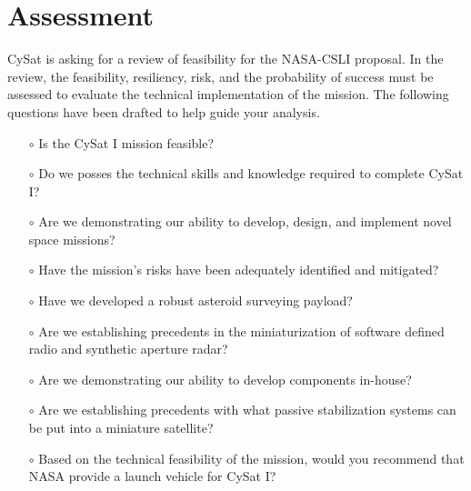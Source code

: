 \documentclass[nocover]            %
{CSLI}                       %
\begin{document}
\section{Assessment}
CySat is asking for a review of feasibility for the NASA-CSLI proposal. In the review, the feasibility, resiliency, risk, and the probability of success must be assessed to evaluate the technical implementation of the mission. The following questions have been drafted to help guide your analysis.\\
\begin{itemize}
\item[$\circ$]Is the CySat I mission feasible?\\
\item[$\circ$]Do we posses the technical skills and knowledge required to complete CySat I?\\
\item[$\circ$]Are we demonstrating our ability to develop, design, and implement novel space missions?\\
\item[$\circ$]Have the mission's risks have been adequately identified and mitigated?\\
\item[$\circ$]Have we developed a robust asteroid surveying payload?\\
\item[$\circ$]Are we establishing precedents in the miniaturization of software defined radio and synthetic aperture radar?\\
\item[$\circ$]Are we demonstrating our ability to develop components in-house?\\
\item[$\circ$]Are we establishing precedents with what passive stabilization systems can be put into a miniature satellite?\\
\item[$\circ$]Based on the technical feasibility of the mission, would you recommend that NASA provide a launch vehicle for CySat I?\\
\end{itemize}
\newpage
\end{document}
